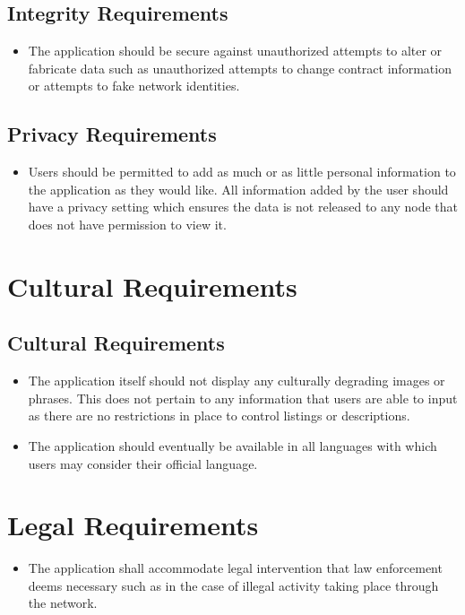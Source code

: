 \documentclass{article}
\begin{document}
\subsection{Integrity Requirements}
\begin{itemize}
        \item 
        The application should be secure against unauthorized attempts to alter or fabricate data such as unauthorized attempts to change contract information or attempts to fake network identities.          
\end{itemize}
\subsection{Privacy Requirements}
\begin{itemize}
        \item 
        Users should be permitted to add as much or as little personal information to the application as they would like. All information added by the user should have a privacy setting which ensures the data is not released to any node that does not have permission to view it.          
\end{itemize}
\section{Cultural Requirements}
\subsection{Cultural Requirements}
\begin{itemize}
\item
The application itself should not display any culturally degrading images or phrases. This does not pertain to any information that users are able to input as there are no restrictions in place to control listings or descriptions. 
\item
The application should eventually be available in all languages with which users may consider their official language.
\end{itemize}
\section{Legal Requirements}
\begin{itemize}
\item
The application shall accommodate legal intervention that law enforcement deems necessary such as in the case of illegal activity taking place through the network. 
\end{itemize}
\end{document}
